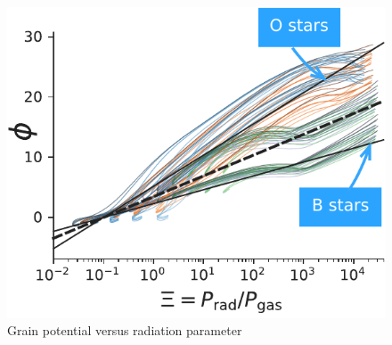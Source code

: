 \begin{figure}
  \centering
  \includegraphics[width=\linewidth]{figs/phi-versus-xi-annotate}
  \caption{Grain potential versus radiation parameter}
  \label{fig:phi-vs-Xi}
\end{figure}


